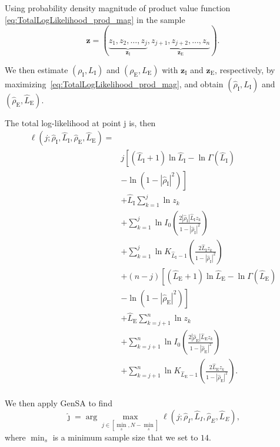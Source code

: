 \documentclass[journal]{IEEEtran}
\begin{document}
Using probability density magnitude of product value function \eqref{eq:TotalLogLikelihood_prod_mag} in the sample
$$
\bm z = (\underbrace{z_1,z_2,\dots,z_j}_{\bm z_\text{I}}, 
\underbrace{z_{j+1}, z_{j+2},\dots,z_n}_{\bm z_\text{E}}).
$$

We then estimate $(\rho_\text{I},L_\text{I})$ and $(\rho_\text{E},L_\text{E})$ with $\bm z_\text{I}$ and $\bm z_\text{E}$, respectively, by maximizing~\eqref{eq:TotalLogLikelihood_prod_mag}, and obtain $(\widehat{\rho}_\text{I}, \widehat{L}_\text{I})$ and $(\widehat{\rho}_\text{E}, \widehat{L}_\text{E})$.

The total log-likelihood at point j is, then
\begin{equation}\label{eq:TotalLogLikelihood_prod_mag}
\begin{split}
\ell(j;\widehat{\rho}_\text{I}, \widehat{L}_\text{I}, \widehat{\rho}_\text{E}, \widehat{L}_\text{E})=\\
      & j\left[(\widehat{L}_\text{I}+1)\ln \widehat{L}_\text{I}-\ln\Gamma(\widehat{L}_\text{I})\right.\\
      &\left.-\ln(1-|\widehat{\rho}_\text{I}|^2)\right]
\\
      &+\widehat{L}_\text{I}\sum_{k=1}^{j} \ln z_k\\
      &+\sum_{k=1}^{j}\ln I_0\left(\frac{2|\widehat{\rho}_\text{I}|\widehat{L}_\text{I} z_k}{1-|\widehat{\rho}_\text{I}|^2}\right)\\
      &+ \sum_{k=1}^{j}\ln K_{\widehat{L}_\text{I}-1}\left(\frac{2\widehat{L}_\text{I}z_k}{1-|\widehat{\rho}_\text{I}|^2}\right)\\
      &+(n-j)\left[(\widehat{L}_\text{E}+1)\ln \widehat{L}_\text{E}-\ln\Gamma(\widehat{L}_\text{E})\right.\\
      &\left.-\ln(1-|\widehat{\rho}_\text{E}|^2)\right]\\
      &+\widehat{L}_\text{E}\sum_{k=j+1}^{n} \ln z_k\\
      &+\sum_{k=j+1}^{n}\ln I_0\left(\frac{2|\widehat{\rho}_\text{E}|\widehat{L}_\text{E} z_k}{1-|\widehat{\rho}_\text{E}|^2}\right)\\
      &+ \sum_{k=j+1}^{n}\ln K_{\widehat{L}_\text{E}-1}\left(\frac{2\widehat{L}_\text{E} z_k}{1-|\widehat{\rho}_\text{E}|^2}\right).\\
\end{split}
\end{equation}

We then apply GenSA to find  
$$
\widehat{\jmath}= \arg\max\limits_{j\in [\min_s,N-\min_s]}\ell(j;\widehat{\rho}_I, \widehat{L}_I,\widehat{\rho}_E, \widehat{L}_E),
$$ 
where $\min_s$ is a minimum sample size that we set to $14$.
\end{document}
